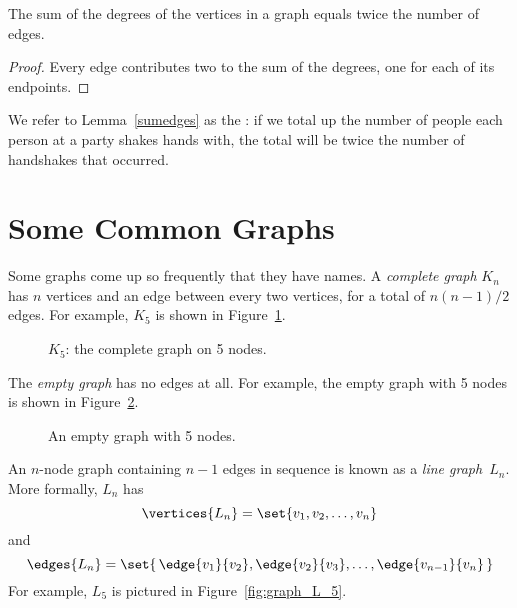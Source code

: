 \begin{lemma}\label{sumedges}
The sum of the degrees of the vertices in a graph equals twice the number of edges.
\end{lemma}

\begin{proof}
Every edge contributes two to the sum of the degrees, one for each of its endpoints.
\end{proof}

We refer to Lemma~\ref{sumedges} as the : if
we total up the number of people each person at a party shakes hands
with, the total will be twice the number of handshakes that occurred.

\begin{problems}

\classproblems
{}

\examproblems
{}
\end{problems}

\section{Some Common Graphs}\label{sec:common_graphs}

Some graphs come up so frequently that they have names.  A
\emph{complete graph}%
$K_n$ has $n$ vertices and an edge between
every two vertices, for a total of $n(n-1)/2$ edges.  For example,
$K_5$ is shown in Figure~\ref{fig:K_5}.

\begin{figure}


\caption{$K_5$: the complete graph on 5 nodes.}
\label{fig:K_5}
\end{figure}

The \emph{empty graph}%
has no edges at all.  For example, the empty
graph with 5 nodes is shown in Figure~\ref{fig:graph_empty_5}.

\begin{figure}


\caption{An empty graph with 5 nodes.}
\label{fig:graph_empty_5}
\end{figure}

An $n$-node graph containing $n - 1$ edges in sequence is known as
a \emph{line graph}~$L_n$.  More formally, $L_n$ has
\begin{equation*}
    \vertices{L_n} = \set{ v_1, v_2, \dots, v_n }
\end{equation*}
and
\begin{equation*}
    \edges{L_n} = \set{\, \edge{v_1}{v_2}, \edge{v_2}{v_3}, \dots,
    \edge{v_{n-1}}{v_n} \, }
\end{equation*}
For example, $L_5$ is pictured in Figure~\ref{fig:graph_L_5}.

